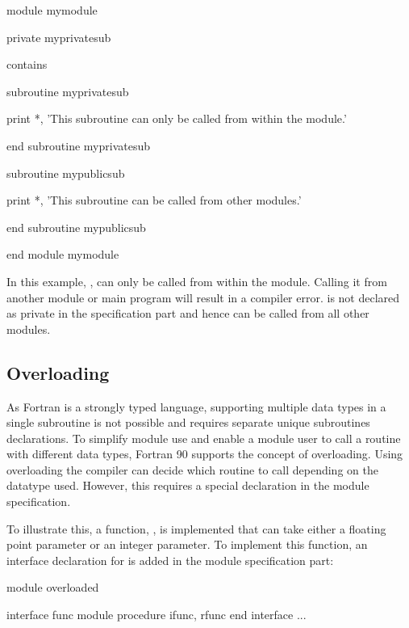\begin{fortrancodeenv}
module mymodule

	private myprivatesub
	
contains

	subroutine myprivatesub
	
		print *, 'This subroutine can only be called from within the module.'
	
	end subroutine myprivatesub
	
	subroutine mypublicsub
	
		print *, 'This subroutine can be called from other modules.'
	
	end subroutine mypublicsub
	
end module mymodule
\end{fortrancodeenv}

In this example, , can only be called from within the module. Calling it from another module or main program will result in a compiler error.  is not declared as private in the specification part and hence can be called from all other modules. 

\subsection{Overloading}

As Fortran is a strongly typed language, supporting multiple data types in a single subroutine is not possible and requires separate unique subroutines declarations. To simplify module use and enable a module user to call a routine with different data types, Fortran 90 supports the concept of overloading. Using overloading the compiler can decide which routine to call depending on the datatype used. However, this requires a special declaration in the module specification. 

To illustrate this, a function, , is implemented that can take either a floating point parameter or an integer parameter. To implement this function, an interface declaration for  is added in the module specification part:

\begin{fortrancodeenv}
module overloaded

	interface func
		module procedure ifunc, rfunc
	end interface
	...
\end{fortrancodeenv}

